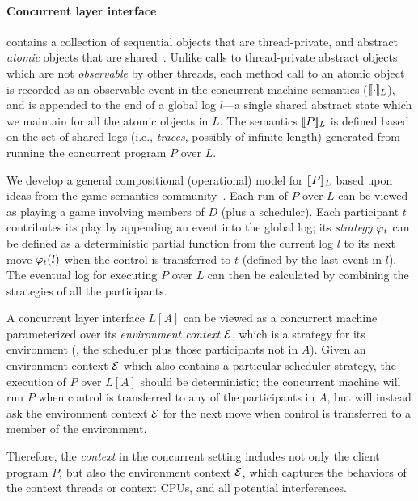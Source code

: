 \paragraph{Concurrent layer interface}
contains a collection of
sequential objects that are thread-private,
and abstract {\em atomic} objects that are shared~\cite{Herlihy08book}. Unlike calls to thread-private abstract objects  which are not {\em observable} by other
threads, each method call to an atomic object is recorded as an 
observable event in the concurrent machine semantics
($\sem{L}{\cdot}$), and is appended to the end of a global log $l$---a
single shared abstract state which we maintain for all the atomic
objects in $L$. The semantics $\sem{L}{P}$ is defined based
on the set of shared logs (i.e., {\em{}traces}, possibly of
infinite length) generated from running the concurrent program $P$
over $L$.

We develop a general compositional (operational) model for
$\sem{L}{P}$ based upon ideas from the game semantics
community~\cite{gsinvite}. Each run of $P$ over $L$ can be viewed as
playing a game involving members of $D$ (plus a scheduler). Each
participant $t$ contributes its play by appending an event into the
global log; its {\em strategy} $\strat{t}$ can be defined as a
deterministic partial function from the current log $l$ to its next
move $\strat{t}(l)$ when the control is transferred to $t$
(defined by the last event in $l$). The
eventual log for executing $P$ over $L$ can then be calculated by
combining the strategies of all the participants.

A concurrent layer interface $L[A]$ can be viewed as a concurrent machine
parameterized over its {\em environment context} $\oracle$, which is a
strategy for its environment (\ie, the scheduler plus those
participants not in $A$).  Given an environment context $\oracle$
which also contains a particular scheduler strategy, the execution of
$P$ over $L[A]$ should be deterministic; the concurrent machine will
run $P$ when control is transferred to any of the participants in $A$, but
will instead ask the environment context $\oracle$ for the next move when 
control is transferred to a member of the environment.

Therefore, the \emph{context} in the concurrent
setting includes not only the client program $P$,
but also the environment context $\oracle$,
which captures the behaviors
of the context threads or context CPUs,
and all potential interferences.

